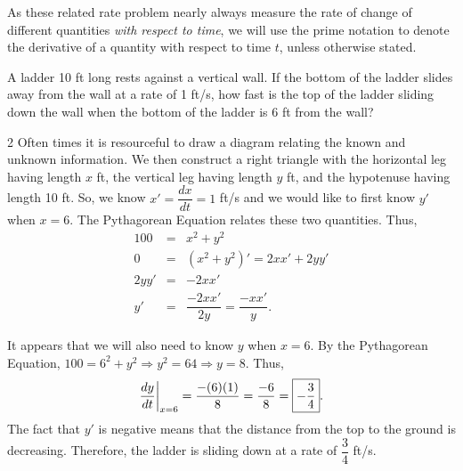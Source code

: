 \documentclass{book}
\begin{document}
As these related rate problem nearly always measure the rate of change of different quantities \emph{with respect to time}, we will use the prime notation to denote the derivative of a quantity with respect to time $t$, unless otherwise stated. 

\begin{Exam} A ladder 10 ft long rests against a vertical wall. If the bottom of the ladder slides away from the wall at a rate of 1 ft/s, how fast is the top of the ladder sliding down the wall when the bottom of the ladder is 6 ft from the wall?
\begin{multicols}{2}
Often times it is resourceful to draw a diagram relating the known and unknown information. We then construct a right triangle with the horizontal leg having length $x$ ft, the vertical leg having length $y$ ft, and the hypotenuse having length 10 ft. So, we know $x ' = \dfrac{dx}{dt}  = 1$ ft/s and we would like to first know $y'$ when $x= 6$. The Pythagorean Equation relates these two quantities. Thus, 
\begin{eqnarray*}
100 &=&  x^2 + y^2\\
0 &=& (x^2+y^2)' = 2xx' + 2yy'\\
2yy' &=& -2xx'\\
y' &=& \dfrac{-2xx'}{2y} = \dfrac{-xx'}{y}.
\end{eqnarray*} 
\begin{center}
\end{center}
\end{multicols}

It appears that we will also need to know $y$ when $x=6$. By the Pythagorean Equation, $100 = 6^2 + y^2 \Rightarrow y^2 = 64 \Rightarrow y =8$. Thus, \[\dfrac{dy}{dt}\bigg|_{x=6} = \dfrac{-(6)(1)}{8} = \dfrac{-6}{8} = \fbox{$-\dfrac{3}{4}$}.\] The fact that $y'$ is negative means that the distance from the top to the ground is decreasing. Therefore, the ladder is sliding down at a rate of $\dfrac{3}{4}$ ft/s. 
\end{Exam}\vs
\end{document}
